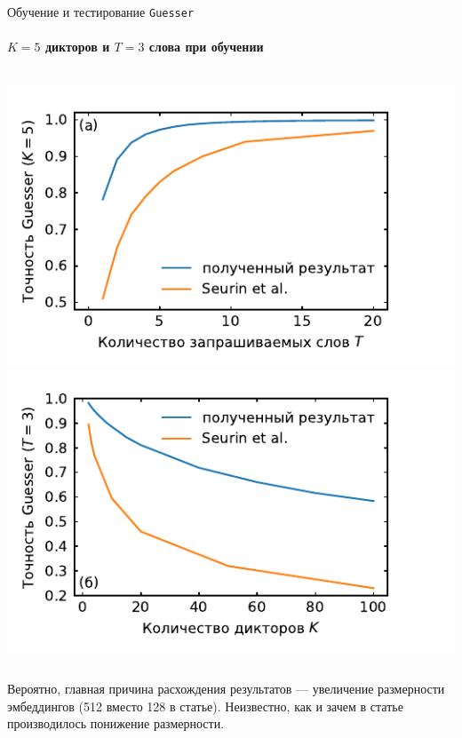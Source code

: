 \documentclass[aspectratio=43]{beamer}
\newcommand{\guesser}{\texttt{Guesser}}
\newcommand{\imgscale}{0.67}
\begin{document}
\begin{frame}[t]{Обучение и тестирование \guesser{}}
    \framesubtitle{$K = 5$ дикторов  и $T = 3$ слова при обучении}
    \begin{columns}
        \centering
        \includegraphics[scale=\imgscale]{../plots/old/word_sweep.pdf}
        \includegraphics[scale=\imgscale]{../plots/old/guest_sweep.pdf}
    \end{columns}\vspace*{1em}

    Вероятно, главная причина расхождения результатов --- увеличение размерности
    эмбеддингов (512 вместо 128 в статье). Неизвестно, как и зачем в статье
    производилось понижение размерности.
\end{frame}
\end{document}
